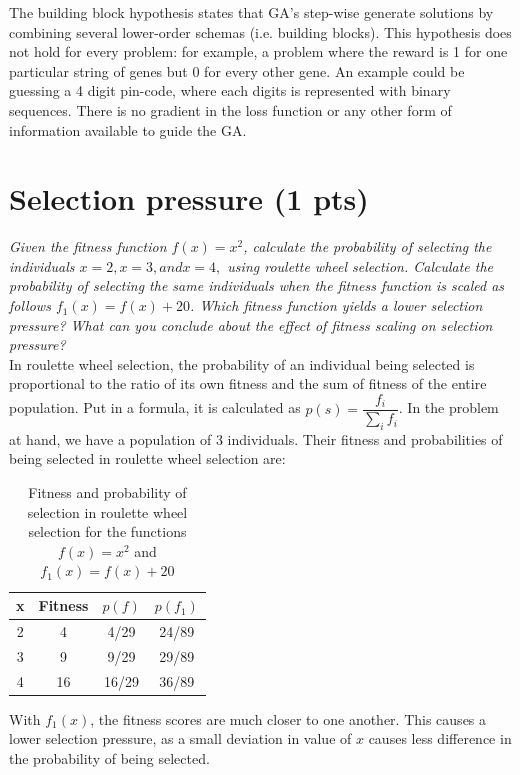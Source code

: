 \documentclass{article}
\begin{document}
The building block hypothesis states that GA's step-wise generate solutions by combining several lower-order schemas (i.e. building blocks). This hypothesis does not hold for every problem: for example, a problem where the reward is 1 for one particular string of genes but 0 for every other gene. An example could be guessing a 4 digit pin-code, where each digits is represented with binary sequences. There is no gradient in the loss function or any other form of information available to guide the GA.

\section{Selection pressure (1 pts)}
\textit{Given the fitness function $f(x) = x^2$, calculate the probability of selecting the individuals $x = 2, x = 3, and x = 4,$ using roulette wheel selection. Calculate the probability of selecting the same individuals when the fitness function is scaled as follows $f_1 (x) = f (x) + 20$. Which fitness function yields a lower selection pressure? What can you conclude about the effect of fitness scaling on selection pressure?} \\ 

In roulette wheel selection, the probability of an individual being selected is proportional to the ratio of its own fitness and the sum of fitness of the entire population. Put in a formula, it is calculated as $p(s) = \dfrac{f_i}{\sum_i f_i}$. In the problem at hand, we have a population of 3 individuals. Their fitness and probabilities of being selected in roulette wheel selection are: \\
\begin{table}[]
    \centering
    \begin{tabular}{c|c|c|c}
    x    & Fitness  & $p(f)$ & $p(f_1)$\\ \hline \hline
    2    &  4       & 4/29 & 24/89 \\ \hline
    3    &  9       & 9/29 & 29/89\\ \hline
    4    &  16      & 16/29 & 36/89\\    
    \end{tabular}
    \caption{Fitness and probability of selection in roulette wheel selection for the functions $f(x)=x^2$ and $f_1(x)=f(x)+20$}
\end{table}

With $f_1(x)$, the fitness scores are much closer to one another. This causes a lower selection pressure, as a small deviation in value of $x$ causes less difference in the probability of being selected.
\end{document}
